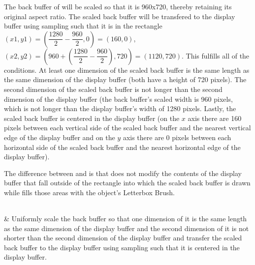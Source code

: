\begin{libreqtab2}
 \begin{example}
 The back buffer of  will be scaled so that it is 960x720, thereby retaining its original aspect ratio. The scaled back buffer will be transfered to the display buffer using sampling such that it is in the rectangle $(x1,y1) = (\dfrac{1280}{2} - \dfrac{960}{2},0) = (160,0)$, $(x2,y2) = (960 + (\dfrac{1280}{2} - \dfrac{960}{2}),720) = (1120,720)$. This fulfills all of the conditions. At least one dimension of the scaled back buffer is the same length as the same dimension of the display buffer (both have a height of 720 pixels). The second dimension of the scaled back buffer is not longer than the second dimension of the display buffer (the back buffer's scaled width is 960 pixels, which is not longer than the display buffer's width of 1280 pixels. Lastly, the scaled back buffer is centered in the display buffer (on the $x$ axis there are 160 pixels between each vertical side of the scaled back buffer and the nearest vertical edge of the display buffer and on the $y$ axis there are 0 pixels between each horizontal side of the scaled back buffer and the nearest horizontal edge of the display buffer).
 \end{example}
 \begin{note}
 The difference between  and  is that  does not modify the contents of the display buffer that fall outside of the rectangle into which the scaled back buffer is drawn while  fills those areas with the  object's Letterbox Brush.
 \end{note}
 \\
 & Uniformly scale the back buffer so that one dimension of it is the same length as the same dimension of the display buffer and the second dimension of it is not shorter than the second dimension of the display buffer and transfer the scaled back buffer to the display buffer using sampling such that it is centered in the display buffer.
 

\end{libreqtab2}
